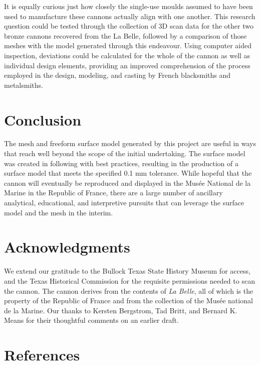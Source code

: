 \documentclass[review]{elsarticle}
\begin{document}
It is equally curious just how closely the single-use moulds assumed to have been used to manufacture these cannons actually align with one another. This research question could be tested through the collection of 3D scan data for the other two bronze cannons recovered from the La Belle, followed by a comparison of those meshes with the model generated through this endeavour. Using computer aided inspection, deviations could be calculated for the whole of the cannon as well as individual design elements, providing an improved comprehension of the process employed in the design, modeling, and casting by French blacksmiths and metalsmiths.

\section*{Conclusion}

The mesh and freeform surface model generated by this project are useful in ways that reach well beyond the scope of the initial undertaking. The surface model was created in following with best practices, resulting in the production of a surface model that meets the specified 0.1 mm tolerance. While hopeful that the cannon will eventually be reproduced and displayed in the Musée National de la Marine in the Republic of France, there are a large number of ancillary analytical, educational, and interpretive pursuits that can leverage the surface model and the mesh in the interim.

\section*{Acknowledgments}

We extend our gratitude to the Bullock Texas State History Museum for access, and the Texas Historical Commission for the requisite permissions needed to scan the cannon. The cannon derives from the contents of \textit{La Belle}, all of which is the property of the Republic of France and from the collection of the Musée national de la Marine. Our thanks to Kersten Bergstrom, Tad Britt, and Bernard K. Means for their thoughtful comments on an earlier draft.

\section*{References}



\end{document}

